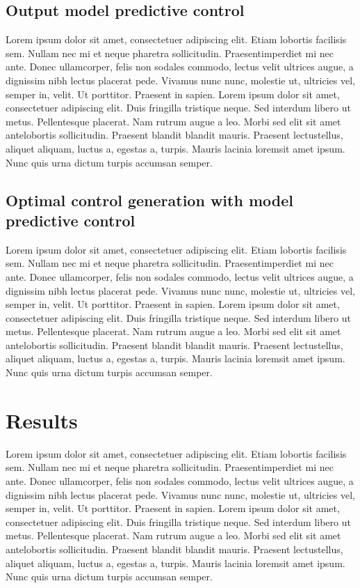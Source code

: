 \subsection{Output model predictive control}

Lorem ipsum dolor sit amet, consectetuer adipiscing elit. Etiam lobortis facilisis sem. Nullam nec mi et neque pharetra sollicitudin. Praesentimperdiet mi nec ante. Donec ullamcorper, felis non sodales commodo, lectus velit ultrices augue, a dignissim nibh lectus placerat pede. Vivamus nunc nunc, molestie ut, ultricies vel, semper in, velit. Ut porttitor. Praesent in sapien. Lorem ipsum dolor sit amet, consectetuer adipiscing elit. Duis fringilla tristique neque. Sed interdum libero ut metus. Pellentesque placerat. Nam rutrum augue a leo. Morbi sed elit sit amet antelobortis sollicitudin. Praesent blandit blandit mauris. Praesent lectustellus, aliquet aliquam, luctus a, egestas a, turpis. Mauris lacinia loremsit amet ipsum. Nunc quis urna dictum turpis accumsan semper.

\subsection{Optimal control generation with model predictive control}

Lorem ipsum dolor sit amet, consectetuer adipiscing elit. Etiam lobortis facilisis sem. Nullam nec mi et neque pharetra sollicitudin. Praesentimperdiet mi nec ante. Donec ullamcorper, felis non sodales commodo, lectus velit ultrices augue, a dignissim nibh lectus placerat pede. Vivamus nunc nunc, molestie ut, ultricies vel, semper in, velit. Ut porttitor. Praesent in sapien. Lorem ipsum dolor sit amet, consectetuer adipiscing elit. Duis fringilla tristique neque. Sed interdum libero ut metus. Pellentesque placerat. Nam rutrum augue a leo. Morbi sed elit sit amet antelobortis sollicitudin. Praesent blandit blandit mauris. Praesent lectustellus, aliquet aliquam, luctus a, egestas a, turpis. Mauris lacinia loremsit amet ipsum. Nunc quis urna dictum turpis accumsan semper.


\section{Results}

Lorem ipsum dolor sit amet, consectetuer adipiscing elit. Etiam lobortis facilisis sem. Nullam nec mi et neque pharetra sollicitudin. Praesentimperdiet mi nec ante. Donec ullamcorper, felis non sodales commodo, lectus velit ultrices augue, a dignissim nibh lectus placerat pede. Vivamus nunc nunc, molestie ut, ultricies vel, semper in, velit. Ut porttitor. Praesent in sapien. Lorem ipsum dolor sit amet, consectetuer adipiscing elit. Duis fringilla tristique neque. Sed interdum libero ut metus. Pellentesque placerat. Nam rutrum augue a leo. Morbi sed elit sit amet antelobortis sollicitudin. Praesent blandit blandit mauris. Praesent lectustellus, aliquet aliquam, luctus a, egestas a, turpis. Mauris lacinia loremsit amet ipsum. Nunc quis urna dictum turpis accumsan semper.

